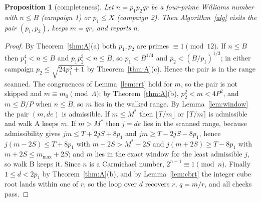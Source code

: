 \documentclass[11pt]{amsart}
\newtheorem{proposition}[theorem]{Proposition}
\theoremstyle{definition}
\theoremstyle{remark}
\begin{document}
\begin{proposition}[completeness]\label{prop:complete}
Let $n=p_1p_2qr$ be a four-prime Williams number with $n\le B$ (campaign 1) or $p_1\le X$ (campaign 2). Then Algorithm~\ref{alg} visits the pair $(p_1,p_2)$, keeps $m=qr$, and reports $n$.
\end{proposition}
\begin{proof}
By Theorem~\ref{thm:A}(a) both $p_1,p_2$ are primes $\equiv1\pmod{12}$. If $n\le B$ then $p_1^4<n\le B$ and $p_1p_2^3<n\le B$, so $p_1<B^{1/4}$ and $p_2<(B/p_1)^{1/3}$; in either campaign $p_2\le\sqrt{24p_1^3+1}$ by Theorem~\ref{thm:A}(c). Hence the pair is in the range scanned. The congruences of Lemma~\ref{lem:crt} hold for $m$, so the pair is not skipped and $m\equiv m_0\pmod\Lambda$; by Theorem~\ref{thm:A}(b), $p_2^2<m<4P^2$, and $m\le B/P$ when $n\le B$, so $m$ lies in the walked range. By Lemma~\ref{lem:window} the pair $(m,de)$ is admissible. If $m\le M^*$ then $\lfloor T/m\rfloor$ or $\lceil T/m\rceil$ is admissible and walk A keeps $m$. If $m>M^*$ then $j=de$ lies in the scanned range, because admissibility gives $jm\le T+2jS+8p_1$ and $jm\ge T-2jS-8p_1$, hence $j(m-2S)\le T+8p_1$ with $m-2S>M^*-2S$ and $j(m+2S)\ge T-8p_1$ with $m+2S\le m_{\max}+2S$; and $m$ lies in the exact window for the least admissible $j$, so walk B keeps it. Since $n$ is a Carmichael number, $2^{n-1}\equiv1\pmod n$. Finally $1\le d<2p_1$ by Theorem~\ref{thm:A}(b), and by Lemma~\ref{lem:cbrt} the integer cube root lands within one of $r$, so the loop over $d$ recovers $r$, $q=m/r$, and all checks pass.
\end{proof}
\end{document}
